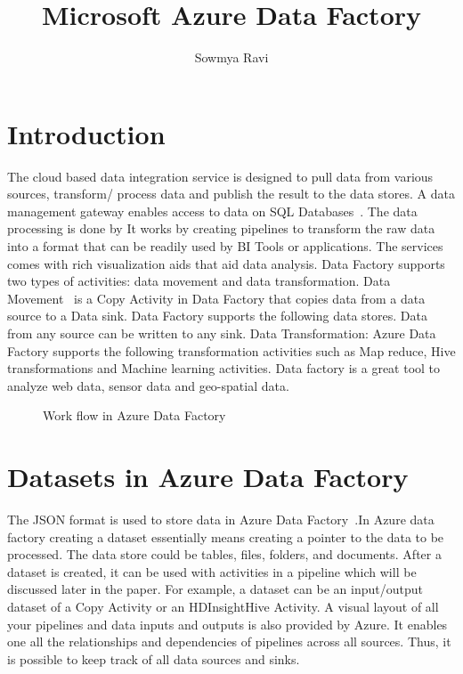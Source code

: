\documentclass[9pt,twocolumn,twoside]{styles/osajnl}
\title{Microsoft Azure Data Factory}
\author[1]{Sowmya Ravi}
\affil[1]{School of Informatics and Computing, Bloomington, IN 47408, U.S.A.}
\affil[*]{Corresponding authors: laszewski@gmail.com}
\begin{document}
\maketitle

\section{Introduction}
The cloud based data integration service is designed to pull data from various sources, transform/ process data and publish the result to the data stores. A data management gateway enables access to data on SQL Databases~\cite{www-jamesserra}. The data processing is done by It works by creating pipelines to  transform the raw data into a format that can be readily used by BI Tools or applications. The services comes with rich visualization aids that aid data analysis. Data Factory supports two types of activities: data movement  and data transformation. Data Movement~\cite{www-microsoft-azure} is a Copy Activity in Data Factory that copies data from a data source to a Data sink. Data Factory supports the following data stores. Data from any source can be written to any sink.  Data Transformation:  Azure Data Factory supports the following transformation activities such as Map reduce, Hive transformations and Machine learning activities.
Data factory is a great tool to analyze web data, sensor data and geo-spatial data.	
\begin{figure}[htbp]
\centering
{}
\caption{Work flow in Azure Data Factory ~\cite{www-microsoft-azure-data}}
\label{fig:copy-local}
\end{figure}


\section{Datasets in Azure Data Factory}

The JSON format is used to store data in Azure Data Factory~\cite{www-microsoft-azure-data}.In Azure data factory creating a dataset essentially means creating a pointer to the data to be processed.
The data store could be tables, files, folders, and documents. After a dataset is created, it can be used with activities in a pipeline which will be discussed later in the paper. For example, a dataset can be an input/output dataset of a Copy Activity or an HDInsightHive Activity. A visual layout of all your pipelines and data inputs and outputs is also provided by Azure. It enables one all the relationships and dependencies of  pipelines across all sources. Thus, it is possible to keep track of all data sources and sinks.
\end{document}
